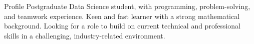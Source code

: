 \begin{rubric}{Profile}
\entry*[]
Postgraduate Data Science student, with programming, problem-solving, and teamwork experience. Keen and fast learner with a strong mathematical background. Looking for a role to build on current technical and professional skills in a challenging, industry-related environment.
\end{rubric}